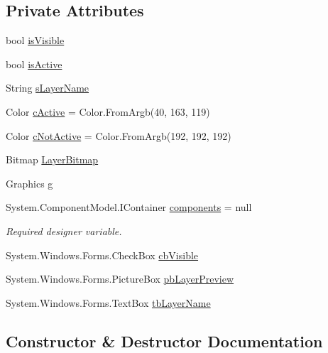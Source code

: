 \subsection*{Private Attributes}
\begin{DoxyCompactItemize}
\item 
bool \mbox{\hyperlink{class_paint___program_1_1_layer_item_a150bf0886b6825b2162abcd707c39848}{is\+Visible}}
\item 
bool \mbox{\hyperlink{class_paint___program_1_1_layer_item_addf7b242ff430f0ae633e4f9a856f463}{is\+Active}}
\item 
String \mbox{\hyperlink{class_paint___program_1_1_layer_item_ac449b2dc7a9ace5fa018c50fc910afe8}{s\+Layer\+Name}}
\item 
Color \mbox{\hyperlink{class_paint___program_1_1_layer_item_a0d48969f95aa232f5e87412b661368f5}{c\+Active}} = Color.\+From\+Argb(40, 163, 119)
\item 
Color \mbox{\hyperlink{class_paint___program_1_1_layer_item_aefd1a426e5a2981f190a699794ddb479}{c\+Not\+Active}} = Color.\+From\+Argb(192, 192, 192)
\item 
Bitmap \mbox{\hyperlink{class_paint___program_1_1_layer_item_a5e7e5d7c82b937b63884b5027ff49817}{Layer\+Bitmap}}
\item 
Graphics \mbox{\hyperlink{class_paint___program_1_1_layer_item_a584d163cf86fefce3ca93a653b3fafc2}{g}}
\item 
System.\+Component\+Model.\+I\+Container \mbox{\hyperlink{class_paint___program_1_1_layer_item_a361143e7af0368cca3162aafcccabf01}{components}} = null
\begin{DoxyCompactList}\small\item\em Required designer variable. \end{DoxyCompactList}\item 
System.\+Windows.\+Forms.\+Check\+Box \mbox{\hyperlink{class_paint___program_1_1_layer_item_a5388fefaa9bf456c098721f3f646ee37}{cb\+Visible}}
\item 
System.\+Windows.\+Forms.\+Picture\+Box \mbox{\hyperlink{class_paint___program_1_1_layer_item_a01edbd43c44469ca11c2e8e7e369c55d}{pb\+Layer\+Preview}}
\item 
System.\+Windows.\+Forms.\+Text\+Box \mbox{\hyperlink{class_paint___program_1_1_layer_item_abb01dd9209b972c3ed47cc841a156eb1}{tb\+Layer\+Name}}
\end{DoxyCompactItemize}


\subsection{Constructor \& Destructor Documentation}
\mbox{\label{class_paint___program_1_1_layer_item_ad6222eb0d085d1534ea611e9459a8625}} 
